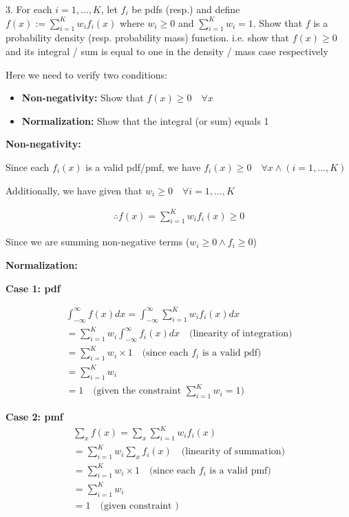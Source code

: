 \documentclass[10pt]{article}
\begin{document}
3. For each $i = 1, …, K$, let $f_i$ be pdfs (resp.) and define $f(x) := \sum_{i = 1}^{K}w_if_i(x)$ where $w_i \geq 0$ and 
$\sum_{i = 1}^{K}w_i = 1$. Show that $f$ is a probability density (resp. probability mass) function. i.e. show that $f(x) \geq 0$ and its integral / sum is equal to one in the density / mass case respectively

Here we need to verify two conditions: 
\begin{itemize}
    \item \textbf{Non-negativity:} Show that $f(x) \geq 0\quad\forall x$
    \item \textbf{Normalization:} Show that the integral (or sum) equals 1
\end{itemize}

\textbf{Non-negativity:}

Since each $f_i(x)$ is a valid pdf/pmf, we have $f_i(x) \geq 0 \quad\forall x \land (i = 1, …, K)$

Additionally, we have given that $w_i \geq 0 \quad\forall i = 1, …, K$

\begin{gather*}
    \therefore f(x) = \sum_{i = 1}^{K} w_i f_i(x) \geq 0
\end{gather*}

Since we are summing non-negative terms ($w_i \geq 0 \land f_i \geq 0$)

\hfill

\textbf{Normalization:}

\textbf{Case 1: pdf}

\begin{gather*}
    \int_{-\infty}^{\infty} f(x) dx = \int_{-\infty}^{\infty} \sum_{i = 1}^{K} w_i f_i(x) dx \\
    = \sum_{i = 1}^{K} w_i \int_{-\infty}^{\infty} f_i(x) dx \quad\text{(linearity of integration)}\\
    = \sum_{i = 1}^{K} w_i \times 1 \quad\text{(since each $f_i$ is a valid pdf)} \\
    = \sum_{i = 1}^{K} w_i \\
    = 1 \quad\text{(given the constraint $\sum_{i = 1}^{K}w_i = 1$)}
\end{gather*}

\textbf{Case 2: pmf}
\begin{gather*}
    \sum_{x} f(x) = \sum_x \sum_{i = 1}^{K} w_i f_i(x) \\
    = \sum_{i = 1}^{K} w_i \sum_x f_i(x) \quad\text{(linearity of summation)}\\
    = \sum_{i = 1}^{K} w_i \times 1 \quad\text{(since each $f_i$ is a valid pmf)}\\
    = \sum_{i = 1}^{K} w_i\\
    = 1 \quad\text{(given constraint )}
\end{gather*}
\end{document}
